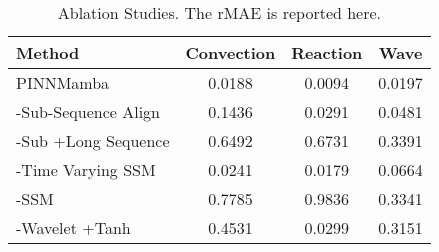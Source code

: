 \begin{table}
\vspace{-3mm}
  \caption{Ablation Studies. The rMAE is reported here.}
  
  \centering
    \small
  \begin{tabular}{lccc}

    \toprule 
    Method & Convection & Reaction & Wave\\
   \midrule
   PINNMamba & 0.0188 & 0.0094 & 0.0197\\
     -Sub-Sequence Align& 0.1436 & 0.0291& 0.0481\\
    -Sub +Long Sequence &0.6492& 0.6731& 0.3391\\
   -Time Varying SSM& 0.0241& 0.0179 & 0.0664 \\
       -SSM &0.7785& 0.9836& 0.3341\\

   -Wavelet +Tanh & 0.4531 &0.0299& 0.3151\\


   

    \bottomrule
  \end{tabular}
  \normalsize
  \label{tab:ablation}
  \vspace{-5mm}
\end{table}